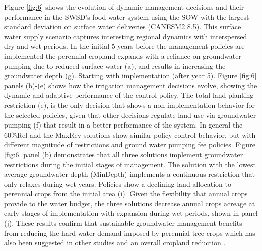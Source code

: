 \documentclass[a4paper,fleqn]{cas-sc}
\begin{document}
Figure \ref{fig:6} shows the evolution of dynamic management decisions and their performance in the SWSD's food-water system using the SOW with the largest standard deviation on surface water deliveries 
(CANESM2 8.5). This surface water supply scenario captures interesting regional dynamics with interspersed dry and wet periods. In the initial 5 years before the management policies are implemented the perennial cropland expands with a reliance on groundwater pumping due to reduced surface water (a), and results in increasing the groundwater depth (g). Starting with implementation (after year 5). Figure \ref{fig:6} panels (b)-(e) shows how the irrigation management decisions evolve, showing the dynamic and adaptive performance of the control policy. The total land planting restriction (e), is the only decision that shows a non-implementation behavior for the selected policies, given that other decisions regulate land use via groundwater pumping (f) that result in a better performance of the system. In general the 60\%Rel and the MaxRev solutions show similar policy control behavior, but with different magnitude of restrictions and ground water pumping fee policies. Figure \ref{fig:6} panel (b) demonstrates that all three solutions implement groundwater restrictions during the initial stages of management. The solution with the lowest average groundwater depth (MinDepth) implements a continuous restriction that only relaxes during wet years. Policies show a declining land allocation to perennial crops from the initial area (i). Given the flexibility that annual crops provide to the water budget, the three solutions decrease annual crops acreage at early stages of implementation with expansion during wet periods, shown in panel (j). These results confirm that sustainable groundwater management benefits from reducing the hard water demand imposed by perennial tree crops which has also been suggested in other studies \citep{qin_flexibility_2019,mall_water_2019} and an overall cropland reduction \citep{hanak_water_2019}. 
\end{document}
